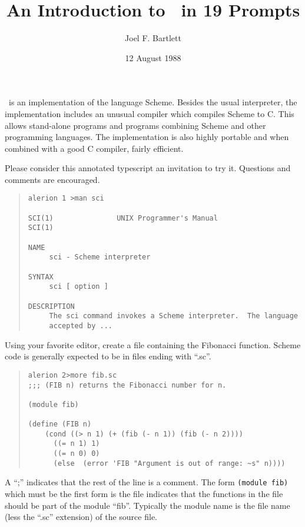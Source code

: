 \documentclass[11pt]{article}
\title{An Introduction to \StoC\ in 19 Prompts}
\author{Joel F. Bartlett}
\date{12 August 1988}
\begin{document}
\maketitle

\StoC\ is an implementation of the language Scheme.  Besides
the usual interpreter, the implementation includes an unusual
compiler which compiles Scheme to C.  This allows stand-alone
programs and programs combining Scheme and other programming
languages.  The implementation is also highly portable and when
combined with a good C compiler, fairly efficient.

Please consider this annotated typescript an invitation to try it.
Questions and comments are encouraged.

\begin{small}
\begin{quote}
\begin{verbatim}
alerion 1 >man sci

SCI(1)               UNIX Programmer's Manual                SCI(1)

NAME
     sci - Scheme interpreter

SYNTAX
     sci [ option ]

DESCRIPTION
     The sci command invokes a Scheme interpreter.  The language
     accepted by ...
\end{verbatim}
\end{quote}
\end{small}

Using your favorite editor, create a file containing the Fibonacci
function.  Scheme code is generally expected to be in files ending
with ``.sc''.

\begin{small}
\begin{quote}
\begin{verbatim}
alerion 2>more fib.sc
;;; (FIB n) returns the Fibonacci number for n.

(module fib)

(define (FIB n)
    (cond ((> n 1) (+ (fib (- n 1)) (fib (- n 2))))
	  ((= n 1) 1)
	  ((= n 0) 0)
	  (else  (error 'FIB "Argument is out of range: ~s" n))))
\end{verbatim}
\end{quote}
\end{small}

A ``;'' indicates that the rest of the line is a comment.  The form
\texttt{(module fib)} which must be the first form is the file indicates
that the functions in the file should be part of the module ``fib''.
Typically the module name is the file name (less the ``.sc'' extension)
of the source file.
\end{document}
